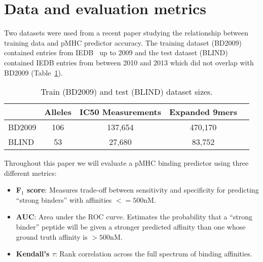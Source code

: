 \section{Data and evaluation metrics}

Two datasets were used from a recent paper studying the relationship between training data and pMHC predictor accuracy\cite{Kim_2014}. The training dataset (BD2009) contained entries from IEDB~\cite{Salimi_2012} up to 2009 and the test dataset (BLIND) contained IEDB entries from between 2010 and 2013 which did not overlap with BD2009 (Table~\ref{tab:datasets}).

\begin{table}[h!]
\centering
\begin{tabular}{l||cccc}
\toprule
{} & Alleles &  IC50 Measurements & Expanded 9mers \\
\midrule
BD2009 &     106 &                           137,654 &        470,170 \\
BLIND  &      53 &                           27,680 &         83,752 \\
\bottomrule
\end{tabular}
\caption{Train (BD2009) and test (BLIND) dataset sizes.}
\label{tab:datasets}
\end{table}

Throughout this paper we will evaluate a pMHC binding predictor using three different metrics:

\begin{itemize}
\item {\bf F$_1$ score}: Measures trade-off between sensitivity and specificity for predicting ``strong binders'' with affinities $<= 500$nM. 
\item {\bf AUC}: Area under the ROC curve. Estimates the probability that a ``strong binder'' peptide will be given a stronger predicted affinity than one whose ground truth affinity is $>500$nM. 
\item {\bf Kendall's $\tau$}: Rank correlation across the full spectrum of binding affinities.
\end{itemize}

